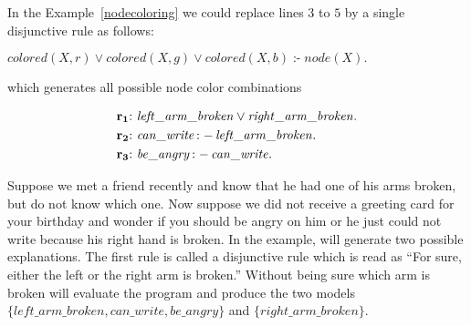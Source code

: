 \documentclass[a4paper, titlepage]{article}
\DeclareMathOperator{\leftimpl}{:-}
\newcommand\mycenterline[1]{\par\smallskip\centerline{#1} \smallskip}
\newcommand{\rowprefix}[1]{%
  \ensuremath{\color{black}\mathbf{#1{:}}\ }%
}
\begin{document}
In the Example~\ref{nodecoloring} we could replace lines $3$ to $5$ by a single disjunctive rule as follows:\\
\mycenterline{$\mathit{colored(X,r)} \vee \mathit{colored(X,g)} \vee \mathit{colored(X,b)} \leftimpl \mathit{node(X).}$} 
%
which generates all possible node color combinations 
\begin{exmp}
\begin{align*}
\rowprefix{r_1}& \mathit{left\_arm\_broken} \vee 
\mathit{right\_arm\_broken}.\\
\rowprefix{r_2}& \mathit{can\_write} \leftimpl 
\mathit{left\_arm\_broken}.\\
\rowprefix{r_3}& \mathit{be\_angry} \leftimpl 
\mathit{can\_write}.
\end{align*}
\end{exmp}
Suppose we met a friend recently and know that he had one 
of his arms broken, but do not know which one. Now suppose 
we did not receive a greeting card for your birthday and 
wonder if you should be angry on him or he just could not 
write because his right hand is broken. In the example, 
\dlvhex{} will generate two possible explanations. The 
first rule is called a disjunctive rule which is read as 
\enquote{For sure, either the left or the right arm is broken.} Without being sure which arm is broken \dlvhex{} 
will evaluate the program and produce the two models 
$\mathit{\{left\_arm\_broken, can\_write, be\_angry\}}$ and 
$\mathit{\{right\_arm\_broken\}}$.
\end{document}
